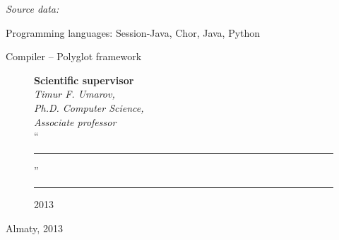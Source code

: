 \begin{titlepage}
    \emph{Source data:}
    
    \begin{compactitem}
    \item Programming languages: Session-Java, Chor, Java, Python
    \item Compiler -- Polyglot framework
    \end{compactitem}


    \begin{figure}[ht]
            \begin{minipage}[t]{0.6\linewidth}
                {\bf Scientific supervisor}\\

                {\em Timur F. Umarov,\\
                Ph.D. Computer Science,\\
                Associate professor}\\
                
                ``\rule{2em}{0.4pt}'' \rule{8em}{0.4pt} 2013\\
         \end{minipage}
    \end{figure}
    
    \begin{center}
        \vfill
        Almaty, 2013
    \end{center}
  
    \end{titlepage}